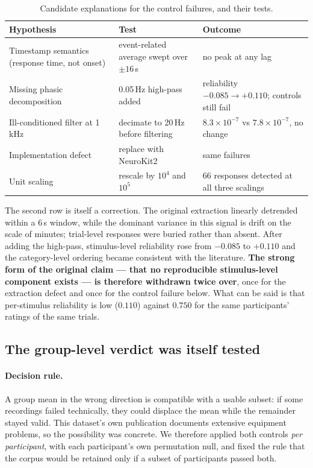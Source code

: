 \begin{table}[htbp]
\centering\small
\caption{Candidate explanations for the control failures, and their tests.}
\begin{tabular}{p{4.6cm}p{4.6cm}p{4.6cm}}
\toprule
Hypothesis & Test & Outcome \\
\midrule
Timestamp semantics (response time, not onset)
  & event-related average swept over $\pm16$\,s
  & no peak at any lag \\
Missing phasic decomposition
  & 0.05\,Hz high-pass added
  & reliability $-0.085 \rightarrow +0.110$; controls still fail \\
Ill-conditioned filter at 1\,kHz
  & decimate to 20\,Hz before filtering
  & $8.3 \times 10^{-7}$ vs $7.8 \times 10^{-7}$, no change \\
Implementation defect
  & replace with NeuroKit2
  & same failures \\
Unit scaling
  & rescale by $10^4$ and $10^5$
  & 66 responses detected at all three scalings \\
\bottomrule
\end{tabular}
\end{table}

The second row is itself a correction. The original extraction linearly detrended
within a 6\,s window, while the dominant variance in this signal is drift on the scale
of minutes; trial-level responses were buried rather than absent. After adding the
high-pass, stimulus-level reliability rose from $-0.085$ to $+0.110$ and the
category-level ordering became consistent with the literature. \textbf{The strong form
of the original claim --- that no reproducible stimulus-level component exists --- is
therefore withdrawn twice over}, once for the extraction defect and once for the
control failure below. What can be said is that per-stimulus reliability is low
($0.110$) against $0.750$ for the same participants' ratings of the same trials.

\subsection{The group-level verdict was itself tested}

\paragraph{Decision rule.}
A group mean in the wrong direction is compatible with a usable subset: if some
recordings failed technically, they could displace the mean while the remainder
stayed valid. This dataset's own publication documents extensive equipment problems,
so the possibility was concrete. We therefore applied both controls \emph{per
participant}, with each participant's own permutation null, and fixed the rule that
the corpus would be retained only if a subset of participants passed both.

